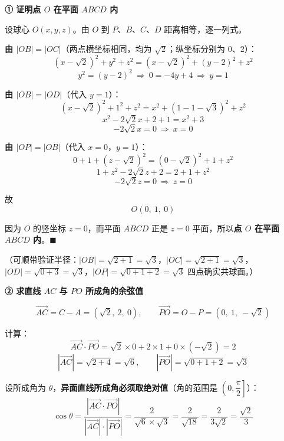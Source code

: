 \begin{answer}
\par\medskip

\textbf{① 证明点 $O$ 在平面 $ABCD$ 内}

设球心 $O(x,y,z)$。由 $O$ 到 $P$、$B$、$C$、$D$ 距离相等，逐一列式。

\textbf{由 $|OB|=|OC|$}（两点横坐标相同，均为 $\sqrt2$；纵坐标分别为 $0$、$2$）：
\nopagebreak[4]
\[(x-\sqrt2)^2+y^2+z^2=(x-\sqrt2)^2+(y-2)^2+z^2\]
\nopagebreak[4]
\[y^2=(y-2)^2\ \Longrightarrow\ 0=-4y+4\ \Longrightarrow\ y=1\]

\textbf{由 $|OB|=|OD|$}（代入 $y=1$）：
\nopagebreak[4]
\[(x-\sqrt2)^2+1^2+z^2=x^2+\left(1-1-\sqrt3\right)^2+z^2\]
\nopagebreak[4]
\[x^2-2\sqrt2x+2+1=x^2+3\]
\nopagebreak[4]
\[-2\sqrt2x=0\ \Longrightarrow\ x=0\]

\textbf{由 $|OP|=|OB|$}（代入 $x=0$，$y=1$）：
\nopagebreak[4]
\[0+1+\left(z-\sqrt2\right)^2=\left(0-\sqrt2\right)^2+1+z^2\]
\nopagebreak[4]
\[1+z^2-2\sqrt2z+2=2+1+z^2\]
\nopagebreak[4]
\[-2\sqrt2z=0\ \Longrightarrow\ z=0\]

故
\nopagebreak[4]
\[O(0,\ 1,\ 0)\]

因为 $O$ 的竖坐标 $z=0$，而平面 $ABCD$ 正是 $z=0$ 平面，所以\textbf{点 $O$ 在平面 $ABCD$ 内}。$\blacksquare$

（可顺带验证半径：$|OB|=\sqrt{2+1}=\sqrt3$，$|OC|=\sqrt{2+1}=\sqrt3$，$|OD|=\sqrt{0+3}=\sqrt3$，$|OP|=\sqrt{0+1+2}=\sqrt3$  四点确实共球面。）

\par\medskip

\textbf{② 求直线 $AC$ 与 $PO$ 所成角的余弦值}

\nopagebreak[4]
\[\overrightarrow{AC}=C-A=\left(\sqrt2,\ 2,\ 0\right),\qquad \overrightarrow{PO}=O-P=\left(0,\ 1,\ -\sqrt2\right)\]

计算：
\nopagebreak[4]
\[\overrightarrow{AC}\cdot\overrightarrow{PO}=\sqrt2\times0+2\times1+0\times\left(-\sqrt2\right)=2\]
\nopagebreak[4]
\[\left|\overrightarrow{AC}\right|=\sqrt{2+4}=\sqrt6,\qquad \left|\overrightarrow{PO}\right|=\sqrt{0+1+2}=\sqrt3\]

设所成角为 $\theta$，\textbf{异面直线所成角必须取绝对值}（角的范围是 $\left(0,\dfrac\pi2\right]$）：
\nopagebreak[4]
\[\cos\theta=\frac{\left|\overrightarrow{AC}\cdot\overrightarrow{PO}\right|}{\left|\overrightarrow{AC}\right|\cdot\left|\overrightarrow{PO}\right|}=\frac{2}{\sqrt6\times\sqrt3}=\frac{2}{\sqrt{18}}=\frac{2}{3\sqrt2}=\frac{\sqrt2}{3}\]


\end{answer}
